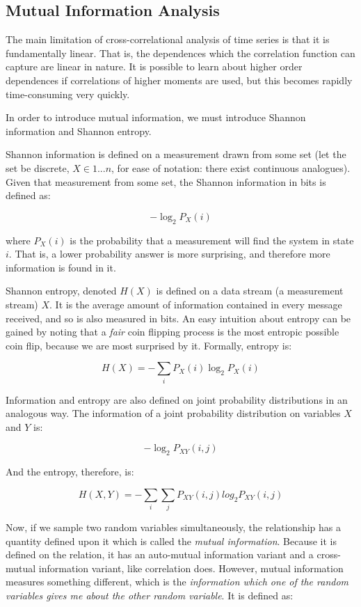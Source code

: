 \documentclass[12pt]{article}
\begin{document}
\subsection{Mutual Information Analysis}

The main limitation of cross-correlational analysis of time series is that it is fundamentally linear. That is, the dependences which the correlation function can capture are linear in nature. It is possible to learn about higher order dependences if correlations of higher moments are used, but this becomes rapidly time-consuming very quickly. %

In order to introduce mutual information, we must introduce Shannon information and Shannon entropy.

Shannon information is defined on a measurement drawn from some set (let the set be discrete, $X \in {1 ... n}$, for ease of notation: there exist continuous analogues). Given that measurement from some set, the Shannon information in bits is defined as:

$$ -\log_2 P_X(i) $$

where $P_X(i)$ is the probability that a measurement will find the system in state $i$. That is, a lower probability answer is more surprising, and therefore more information is found in it.

Shannon entropy, denoted $H(X)$ is defined on a data stream (a measurement stream) $X$. It is the average amount of information contained in every message received, and so is also measured in bits. An easy intuition about entropy can be gained by noting that a \emph{fair} coin flipping process is the most entropic possible coin flip, because we are most surprised by it. Formally, entropy is:

$$H(X) = -\sum_i P_X(i) \log_2 P_X(i)$$

Information and entropy are also defined on joint probability distributions in an analogous way. The information of a joint probability distribution on variables $X$ and $Y$ is:

$$ -\log_2 P_{XY}(i, j) $$

And the entropy, therefore, is:

$$H(X, Y) = -\sum_i \sum_j P_{XY}(i, j) log_2 P_{XY}(i, j)$$

Now, if we sample two random variables simultaneously, the relationship has a quantity defined upon it which is called the \emph{mutual information}. Because it is defined on the relation, it has an auto-mutual information variant and a cross-mutual information variant, like correlation does. However, mutual information measures something different, which is the \emph{information which one of the random variables gives me about the other random variable}. It is defined as:
\end{document}

